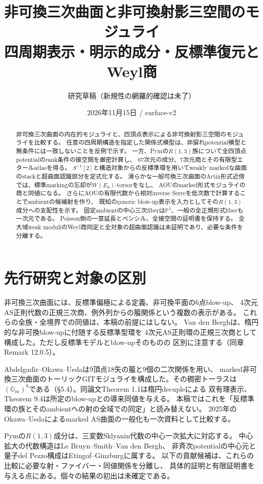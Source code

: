 \documentclass[11pt,a4paper]{ltjsarticle}
\title{非可換三次曲面と非可換射影三空間のモジュライ\\\large 四周期表示・明示的成分・反標準復元とWeyl商}
\author{研究草稿（新規性の網羅的確認は未了）}
\date{2026年11月15日 / surface-v2}
\theoremstyle{definition}\newtheorem{remark}[theorem]{注意}
\newcommand{\PP}{\mathbb P}\newcommand{\kk}{\mathbb C}
\begin{document}
\maketitle
\begin{abstract}
非可換三次曲面の内在的モジュライと、四頂点表示による非可換射影三空間のモジュライを比較する。
任意の四周期構造を指定した関係式模型は、非捩れpotential模型と無条件には一致しないことを反例で示す。
一方、Pymの$R(1,3)$族について全四頂点potentialのrank条件の接空間を厳密計算し、
67次元の成分、7次元商とその有限型エタールatlasを得る。
$S^{-1}[2]$と構造対象からの反標準環を用いてweakly markedな曲面のstackと超曲面認識部分を定式化する。
滑らかな一般可換三次曲面のArtin形式近傍では、標準markingの忘却が$W(E_6)$-torsorをなし、
AOUのmarked形式モジュライの商と同値になる。
さらにAOUの有限代数から相対inverse Serreを低次数で計算することでambientの候補射を作り、
既知のgeneric blow-up表示を入力としてその$R(1,3)$成分への支配性を示す。
固定ambientの中心三次fiberは$\PP^1$、一般の全正規形式fiberも一次元である。
Poisson側の一意延長とペンシル、全接空間の証明書を保持する。
全大域weak moduliのWeyl商同定と全対象の超曲面認識は未証明であり、必要な条件を分離する。
\end{abstract}
{\small\tableofcontents}
\clearpage


\section{先行研究と対象の区別}
非可換三次曲面には、反標準偏極による定義、非可換平面の6点blow-up、
4次元AS正則代数の正規三次商、例外列からの箙関係という複数の表示がある。
これらの全族・全境界での同値は、本稿の前提にはしない。
Van den Bergh\cite[Chapter 12]{VdB}は、楕円的な非可換blow-upに付随する反標準型環を
4次元AS正則環の正規三次商として構成した。ただし反標準モデルとblow-upそのものの
区別に注意する（同章Remark 12.0.5）。

Abdelgadir--Okawa--Ueda\cite{AOU}は9頂点18矢の箙と9個の二次関係を用い、
marked非可換三次曲面のトーリックGITモジュライを構成した。その稠密トーラスは
$(\mathbb G_m)^8$である（\S5.4）。同論文Theorem 1.1は楕円decupleによる
双有理表示、Theorem 9.4は所定のblow-upとの導来同値を与える。
本稿ではこれを「反標準環の族とそのambientへの射の全域での同定」と読み替えない。
2025年のOkawa--Ueda\cite{OU2025}によるmarked AS曲面の一般化も一次資料として比較する。

Pym\cite[\S3.4]{Pym}の$R(1,3)$成分は、三変数Sklyanin代数の中心一次拡大に対応する。
中心拡大の代数構造はLe Bruyn--Smith--Van den Bergh\cite{LBS}、
非斉次potentialの中心元と量子del Pezzo構成はEtingof--Ginzburg\cite{EG}に属する。
以下の貢献候補は、これらの比較に必要な射・ファイバー・同値関係を分離し、
具体的証明と有限証明書を与える点にある。個々の結果の初出は未確定である。
\end{document}
